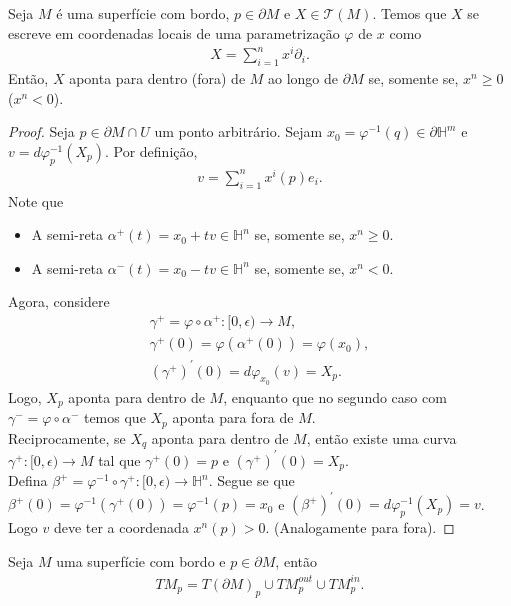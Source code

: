 \begin{proposition}
  Seja $M$ é uma superfície com bordo, $p\in\partial M$ e $X\in\mathcal{T}(M)$. Temos que $X$ se escreve em coordenadas locais de uma parametrização $\varphi$ de $x$ como
  \begin{align*}
    X=\sum_{i=1}^{n}x^{i}\partial_i.
  \end{align*}
  Então, $X$  aponta para dentro (fora) de $M$ ao longo de $\partial M$ se, somente se, $x^{n}\geq 0$ ($x^{n}< 0$). 
\end{proposition}
\begin{proof} 
  Seja $p\in\partial M\cap U$ um ponto arbitrário. Sejam $x_0=\varphi^{-1}(q)\in\partial\mathbb{H}^{m}$ e $v=d\varphi_p^{-1}(X_p)$. Por definição,
  \begin{align*}
    v=\sum_{i=1}^{n}x^{i}(p)e_i.
  \end{align*}
  Note que
  \begin{itemize}
    \item A semi-reta $\alpha^{+}(t)=x_0+tv\in\mathbb{H}^{n}$ se, somente se, $x^{n}\geq 0$. 
    \item A semi-reta $\alpha^{-}(t)=x_0-tv\in\mathbb{H}^{n}$ se, somente se, $x^{n}< 0$. 
  \end{itemize}
  Agora, considere
  \begin{align*}
    \gamma^{+}=\varphi\circ\alpha^{+}:[0,\epsilon)\to M,\\
    \gamma^{+}(0)=\varphi(\alpha^{+}(0))=\varphi(x_0),\\
    (\gamma^{+})^{\prime}(0)=d\varphi_{x_0}(v)=X_p.
  \end{align*}
  Logo, $X_p$ aponta para dentro de $M$, enquanto que no segundo caso com $\gamma^{-}=\varphi\circ\alpha^{-}$ temos que $X_{p}$ aponta para fora de $M$.\\
  Reciprocamente, se $X_{q}$ aponta para dentro de $M$, então existe uma curva $\gamma^{+}:[0,\epsilon)\to M$ tal que $\gamma^{+}(0)=p$ e $(\gamma^{+})^{\prime}(0)=X_p$.\\
  Defina $\beta^{+}=\varphi^{-1}\circ\gamma^{+}:[0,\epsilon)\to \mathbb{H}^{n}$. Segue se que $\beta^{+}(0)=\varphi^{-1}(\gamma^{+}(0))=\varphi^{-1}(p)=x_0$ e $(\beta^{+})^{\prime}(0)=d\varphi^{-1}_p(X_p)=v$. Logo $v$ deve ter a coordenada $x^{n}(p)>0$. (Analogamente para fora).
\end{proof}
\begin{corollary}
  Seja $M$ uma superfície com bordo e $p\in\partial M$, então
  \begin{align*}
    TM_p=T(\partial M)_p\cup TM_p^{out}\cup TM_p^{in}.
  \end{align*}
\end{corollary}
